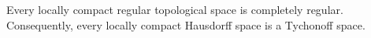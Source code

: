 Every locally compact regular topological space is completely regular. Consequently, every locally compact Hausdorff space is a Tychonoff space.
